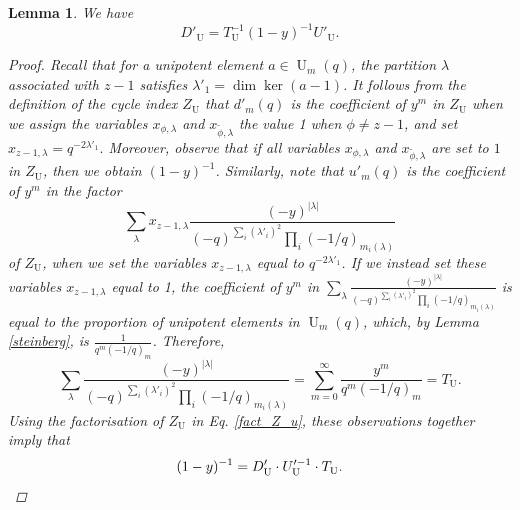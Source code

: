 \documentclass[10pt,a4paper]{amsart}
\newtheorem{lemma}{Lemma}
\DeclareMathOperator{\U}{U}
\begin{document}
\begin{lemma}
\label{fact_D'_u}
We have
$$D'_{\U}=T^{-1}_{\U}(1-y)^{-1}U'_{\U}.$$
\begin{proof}
Recall that for a unipotent element $a \in \U_m(q)$, the partition $\lambda$ associated with $z-1$ satisfies $\lambda'_1=\dim \ker(a-1)$. It follows from the definition of the cycle index $Z_{\U}$ 
 that $d'_m(q)$ is the coefficient of $y^m$ in $Z_{\U}$ when we assign the variables $x_{\phi,\lambda}$ and $x_{\widetilde{\phi},\lambda}$ the value 1 when $\phi \neq z-1$, and set $x_{z-1,\lambda}=q^{-2\lambda'_1}.$
 Moreover, observe that if all variables $x_{\phi,\lambda}$ and $x_{\widetilde{\phi},\lambda}$ are set to $1$ in $Z_{\U}$, then we obtain $(1-y)^{-1}$. Similarly, note that $u'_m(q)$ is the coefficient of $y^m$ in the factor 
  $$\sum_{\lambda}x_{z-1,\lambda}\frac{(-y)^{|\lambda|}}{(-q)^{\sum_{i}(\lambda'_i)^2}\prod_i(-1/q)_{m_i(\lambda)}}$$
of $Z_{\U}$, when we set the variables $x_{z-1,\lambda}$ equal to $q^{-2\lambda'_1}$. If we instead set these variables $x_{z-1,\lambda}$ equal to 1,
the coefficient of $y^m$ in $\sum_{\lambda}\frac{(-y)^{|\lambda|}}{(-q)^{\sum_{i}(\lambda'_i)^2}\prod_i(-1/q)_{m_i(\lambda)}}$ is equal to the proportion of unipotent elements in $\U_m(q)$, which, by Lemma \ref{steinberg}, is $\frac{1}{q^m(-1/q)_m}$.
Therefore, 
 $$\sum_{\lambda}\frac{(-y)^{|\lambda|}}{(-q)^{\sum_{i}(\lambda'_i)^2}\prod_i(-1/q)_{m_i(\lambda)}}=
 \sum_{m=0}^{\infty}\frac{y^m}{q^m(-1/q)_m}=T_{\U}.$$
Using the factorisation of $Z_{\U}$ in Eq. \eqref{fact_Z_u}, these observations together imply that
 \begin{equation*}
 (1-y)^{-1}=D'_{\U}\cdot U'^{-1}_{\U} \cdot T_{\U}. \qedhere 
\end{equation*}
\end{proof}
\end{lemma}
\end{document}
